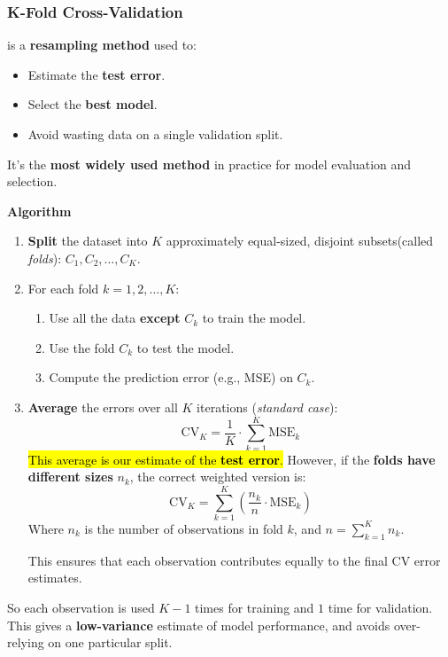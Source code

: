 \subsubsection{K-Fold Cross-Validation}\label{subsubsection: K-Fold Cross-Validation}

 is a \textbf{resampling method} used to:
\begin{itemize}
    \item Estimate the \textbf{test error}.
    \item Select the \textbf{best model}.
    \item Avoid wasting data on a single validation split.
\end{itemize}
It's the \textbf{most widely used method} in practice for model evaluation and selection.

\highspace
\begin{flushleft}
    \textcolor{Green3}{ \textbf{Algorithm}}
\end{flushleft}
\begin{enumerate}
    \item \textbf{Split} the dataset into $K$ approximately equal-sized, disjoint subsets\break (called \emph{folds}): $C_1, C_2, \dots, C_K$.
    \item For each fold $k = 1, 2, \dots, K$:
    \begin{enumerate}
        \item Use all the data \textbf{except} $C_k$ to train the model.
        \item Use the fold $C_k$ to test the model.
        \item Compute the prediction error (e.g., MSE) on $C_k$.
    \end{enumerate}
    \item \textbf{Average} the errors over all $K$ iterations (\emph{standard case}):
    \begin{equation}
        \text{CV}_K = \frac{1}{K} \cdot \sum_{k=1}^K \text{MSE}_k
    \end{equation}
    \hl{This average is our estimate of the \textbf{test error}.} However, if the \textbf{folds have different sizes} $n_k$, the correct weighted version is:
    \begin{equation}
        \text{CV}_K = \sum_{k=1}^K \left( \dfrac{n_k}{n} \cdot \text{MSE}_k \right)
    \end{equation}
    Where $n_k$ is the number of observations in fold $k$, and $n = \displaystyle\sum_{k=1}^K n_k$.
    
    This ensures that each observation contributes equally to the final CV error estimates.
\end{enumerate}
So each observation is used $K-1$ times for training and $1$ time for validation. This gives a \textbf{low-variance} estimate of model performance, and avoids over-relying on one particular split.

